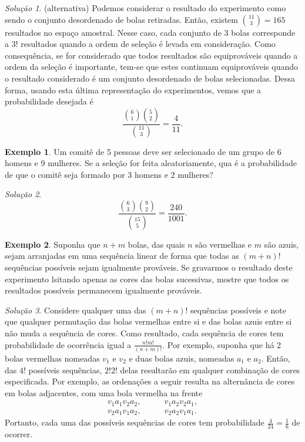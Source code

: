 \documentclass[]{book}
\theoremstyle{definition}
\theoremstyle{definition}
\newtheorem{example}{Exemplo}[chapter]
\theoremstyle{definition}
\theoremstyle{remark}
\newtheorem*{solution}{Solução}
\begin{document}
\begin{solution}
\iffalse{} {Solução. } \fi{}(alternativa)
Podemos considerar o resultado do experimento como sendo o conjunto desordenado de bolas retiradas.
Então, existem \({11 \choose 3}=165\) resultados no espaço amostral.
Nesse caso, cada conjunto de 3 bolas corresponde a \(3!\) resultados quando a ordem de seleção é levada em consideração.
Como consequência, se for considerado que todos resultados são equiprováveis quando a ordem da seleção é importante, tem-se que estes continuam equiprováveis quando o resultado considerado é um conjunto desordenado de bolas selecionadas.
Dessa forma, usando esta última representação do experimentos, vemos que a probabilidade desejada é
\[\frac{{6\choose 1}{5\choose 2}}{{11\choose 3}} = \frac{4}{11}.\]
\end{solution}

\begin{example}
\protect\hypertarget{exm:unnamed-chunk-108}{}{\label{exm:unnamed-chunk-108} }Um comitê de 5 pessoas deve ser selecionado de um grupo de 6 homens e 9 mulheres.
Se a seleção for feita aleatoriamente, qua é a probabilidade de que o comitê seja formado por 3 homens e 2 mulheres?
\end{example}

\begin{solution}
\iffalse{} {Solução. } \fi{}\[\frac{{6\choose 3}{9 \choose 2}}{{15 \choose 5}} = \frac{240}{1001}.\]
\end{solution}

\begin{example}
\protect\hypertarget{exm:unnamed-chunk-110}{}{\label{exm:unnamed-chunk-110} }Suponha que \(n+m\) bolas, das quais \(n\) são vermelhas e \(m\) são azuis, sejam arranjadas em uma sequência linear de forma que todas as \((m+n)!\) sequências possíveis sejam igualmente prováveis.
Se gravarmos o resultado deste experimento lsitando apenas as cores das bolas sucessivas, mostre que todos os resultados possíveis permanecem igualmente prováveis.
\end{example}

\begin{solution}
\iffalse{} {Solução. } \fi{}Considere qualquer uma das \((m+n)!\) sequências possíveis e note que qualquer permutação das bolas vermelhas entre si e das bolas azuis entre si não muda a sequência de cores.
Como resultado, cada sequência de cores tem probabilidade de ocorrência igual a \(\frac{n!m!}{(n+m)!}.\)
Por exemplo, suponha que há 2 bolas vermelhas nomeadas \(v_1\) e \(v_2\) e duas bolas azuis, nomeadas \(a_1\) e \(a_2\).
Então, das \(4!\) possíveis sequências, \(2!2!\) delas resultarão em qualquer combinação de cores especificada.
Por exemplo, as ordenações a seguir resulta na alternância de cores em bolas adjacentes, com uma bola vermelha na frente
\begin{align}
v_1 a_1 v_2 a_2, & \qquad v_1 a_2 v_2 a_1, \\
v_2 a_1 v_1 a_2, & \qquad v_2 a_2 v_1 a_1.
\end{align}
Portanto, cada uma das possíveis sequências de cores tem probabilidade \(\frac{4}{24}=\frac{1}{6}\) de ocorrer.
\end{solution}
\end{document}
